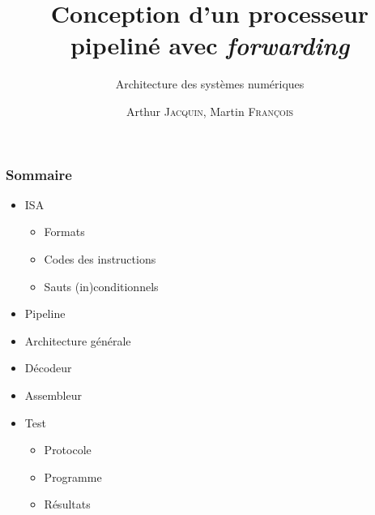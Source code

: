 \documentclass{beamer}
\title{Conception d'un processeur pipeliné avec \textit{forwarding}}
\subtitle{Architecture des systèmes numériques}
\author{Arthur \textsc{Jacquin}, Martin \textsc{François}}
\institute{\textsc{CentraleSupélec - Université Paris-Saclay}}
\begin{document}
\frame{\titlepage}

\begin{frame}
\frametitle{Sommaire}
\begin{itemize}
\item ISA
    \begin{itemize}
    \item Formats
    \item Codes des instructions
    \item Sauts (in)conditionnels
    \end{itemize}
\item Pipeline
\item Architecture générale
\item Décodeur
\item Assembleur
\item Test
    \begin{itemize}
    \item Protocole
    \item Programme
    \item Résultats
    \end{itemize}
\end{itemize}
\end{frame}
\end{document}
